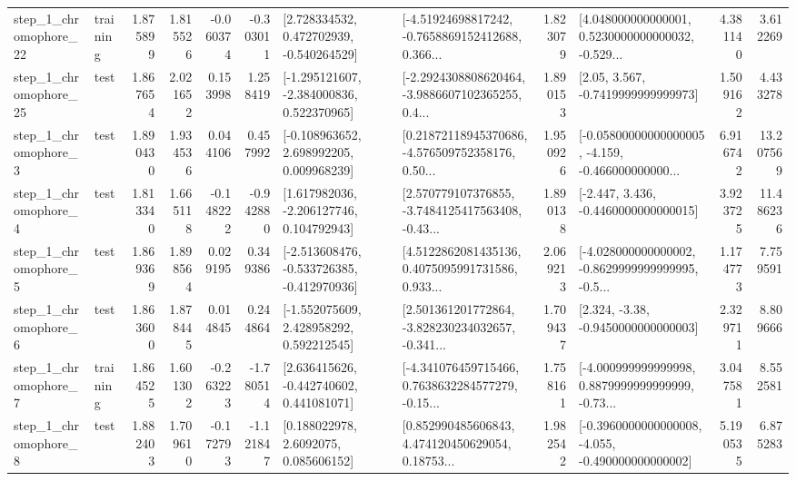 \begin{tabular}{llrrrrllrlrr}
    step\_1\_chromophore\_22 &  training &      1.875899 &    1.815526 &     -0.060374 & -0.303011 &    [2.728334532, 0.472702939, -0.540264529] &  [-4.51924698817242, -0.7658869152412688, 0.366... &       1.823079 &  [4.048000000000001, 0.5230000000000032, -0.529... &            4.381140 &          3.612269 \\
    step\_1\_chromophore\_25 &      test &      1.867654 &    2.021652 &      0.153998 &  1.258419 &   [-1.295121607, -2.384000836, 0.522370965] &  [-2.2924308808620464, -3.9886607102365255, 0.4... &       1.890153 &                 [2.05, 3.567, -0.7419999999999973] &            1.509162 &          4.433278 \\
     step\_1\_chromophore\_3 &      test &      1.890430 &    1.934536 &      0.044106 &  0.457992 &    [-0.108963652, 2.698992205, 0.009968239] &  [0.21872118945370686, -4.576509752358176, 0.50... &       1.950926 &  [-0.05800000000000005, -4.159, -0.466000000000... &            6.916742 &         13.207569 \\
     step\_1\_chromophore\_4 &      test &      1.813340 &    1.665118 &     -0.148222 & -0.942880 &    [1.617982036, -2.206127746, 0.104792943] &  [2.570779107376855, -3.7484125417563408, -0.43... &       1.890138 &               [-2.447, 3.436, -0.4460000000000015] &            3.923725 &         11.486236 \\
     step\_1\_chromophore\_5 &      test &      1.869369 &    1.898564 &      0.029195 &  0.349386 &  [-2.513608476, -0.533726385, -0.412970936] &  [4.5122862081435136, 0.4075095991731586, 0.933... &       2.069213 &  [-4.028000000000002, -0.8629999999999995, -0.5... &            1.174773 &          7.759591 \\
     step\_1\_chromophore\_6 &      test &      1.863600 &    1.878445 &      0.014845 &  0.244864 &    [-1.552075609, 2.428958292, 0.592212545] &  [2.501361201772864, -3.828230234032657, -0.341... &       1.709437 &                [2.324, -3.38, -0.9450000000000003] &            2.329711 &          8.809666 \\
     step\_1\_chromophore\_7 &  training &      1.864525 &    1.601302 &     -0.263223 & -1.780514 &    [2.636415626, -0.442740602, 0.441081071] &  [-4.341076459715466, 0.7638632284577279, -0.15... &       1.758161 &  [-4.000999999999998, 0.8879999999999999, -0.73... &            3.047581 &          8.552581 \\
     step\_1\_chromophore\_8 &      test &      1.882403 &    1.709610 &     -0.172793 & -1.121847 &       [0.188022978, 2.6092075, 0.085606152] &  [0.852990485606843, 4.474120450629054, 0.18753... &       1.982542 &  [-0.3960000000000008, -4.055, -0.490000000000002] &            5.190535 &          6.875283 \\

\end{tabular}
